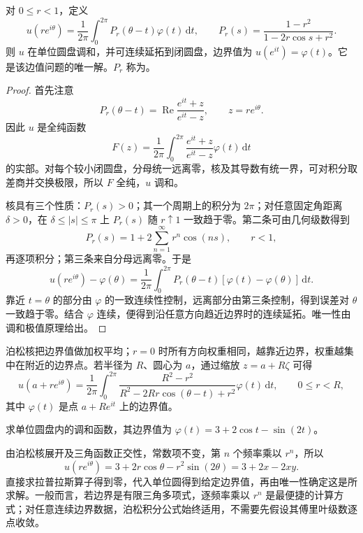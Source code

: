 \documentclass[UTF8,12pt,a4paper,fontset=fandol]{ctexbook}
\begin{document}
\begin{theorem}[圆盘上的泊松公式]
\label{thm:cv-poisson}
对 $0\le r<1$，定义
\begin{equation}
 u(re^{i\theta})=\frac1{2\pi}\int_0^{2\pi}
 P_r(\theta-t)\varphi(t)\,\mathrm dt,
 \qquad
 P_r(s)=\frac{1-r^2}{1-2r\cos s+r^2}.
 \label{eq:cv-poisson}
\end{equation}
则 $u$ 在单位圆盘调和，并可连续延拓到闭圆盘，边界值为 $u(e^{it})=\varphi(t)$。它是该边值问题的唯一解。$P_r$ 称为。
\end{theorem}
\begin{proof}
首先注意
\[
 P_r(\theta-t)=\operatorname{Re}\frac{e^{it}+z}{e^{it}-z},\qquad z=re^{i\theta}.
\]
因此 $u$ 是全纯函数
\[
 F(z)=\frac1{2\pi}\int_0^{2\pi}\frac{e^{it}+z}{e^{it}-z}\varphi(t)\,\mathrm dt
\]
的实部。对每个较小闭圆盘，分母统一远离零，核及其导数有统一界，可对积分取差商并交换极限，所以 $F$ 全纯，$u$ 调和。

核具有三个性质：$P_r(s)>0$；其一个周期上的积分为 $2\pi$；对任意固定角距离 $\delta>0$，在 $\delta\le|s|\le\pi$ 上 $P_r(s)$ 随 $r\uparrow1$ 一致趋于零。第二条可由几何级数得到
\[
 P_r(s)=1+2\sum_{n=1}^\infty r^n\cos(ns),\qquad r<1,
\]
再逐项积分；第三条来自分母远离零。于是
\[
 u(re^{i\theta})-\varphi(\theta)
 =\frac1{2\pi}\int_0^{2\pi}P_r(\theta-t)
 [\varphi(t)-\varphi(\theta)]\,\mathrm dt.
\]
靠近 $t=\theta$ 的部分由 $\varphi$ 的一致连续性控制，远离部分由第三条控制，得到误差对 $\theta$ 一致趋于零。结合 $\varphi$ 连续，便得到沿任意方向趋近边界时的连续延拓。唯一性由调和极值原理给出。
\end{proof}

泊松核把边界值做加权平均；$r=0$ 时所有方向权重相同，越靠近边界，权重越集中在附近的边界点。若半径为 $R$、圆心为 $a$，通过缩放 $z=a+R\zeta$ 可得
\[
 u(a+re^{i\theta})=\frac1{2\pi}\int_0^{2\pi}
 \frac{R^2-r^2}{R^2-2Rr\cos(\theta-t)+r^2}
 \varphi(t)\,\mathrm dt,\qquad 0\le r<R,
\]
其中 $\varphi(t)$ 是点 $a+Re^{it}$ 上的边界值。

\begin{example}[由边界的三角多项式求内部解]
求单位圆盘内的调和函数，其边界值为 $\varphi(t)=3+2\cos t-\sin(2t)$。
\end{example}
\begin{solve}
由泊松核展开及三角函数正交性，常数项不变，第 $n$ 个频率乘以 $r^n$，所以
\[
 u(re^{i\theta})=3+2r\cos\theta-r^2\sin(2\theta)
 =3+2x-2xy.
\]
直接求拉普拉斯算子得到零，代入单位圆得到给定边界值，再由唯一性确定这是所求解。一般而言，若边界是有限三角多项式，逐频率乘以 $r^n$ 是最便捷的计算方式；对任意连续边界数据，泊松积分公式始终适用，不需要先假设其傅里叶级数逐点收敛。
\end{solve}
\end{document}
